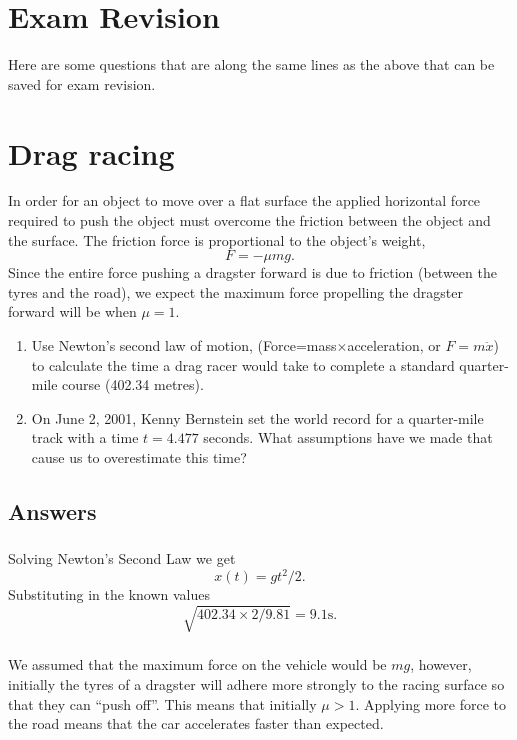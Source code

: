 \documentclass[10pt]{article}
\newcommand{\bb}{\begin{equation}}
\newcommand{\ee}{\end{equation}}
\begin{document}
\section*{Exam Revision}
Here are some questions that are along the same lines as the above that can be saved for exam revision.
\section{Drag racing}
In order for an object to move over a flat surface the applied horizontal force required to push the object must overcome the friction between the object and the surface. The friction force is proportional to the object's weight,
\bb
F=-\mu mg.
\ee
Since the entire force pushing a dragster forward is due to friction (between the tyres and the road), we expect the maximum force propelling the dragster forward will be when $\mu=1$.
\begin{enumerate}
\item Use Newton's second law of motion, (Force=mass$\times$acceleration, or $F=m\ddot{x}$) to calculate the time a drag racer would take to complete a standard quarter-mile
course (402.34 metres).
\item On June 2, 2001, Kenny Bernstein set the world record for a
quarter-mile track with a time $t = 4.477$ seconds. What assumptions have we made that cause us to overestimate this time?
\end{enumerate}
\begin{Answ}
\subsection{Answers}
\subsubsection{}
Solving Newton's Second Law we get
\bb
x(t)=gt^2/2.
\ee
Substituting in the known values
\bb
\sqrt{402.34\times 2/9.81}= 9.1 \textrm{s}.
\ee
\subsubsection{}
We assumed that the maximum force on the vehicle would be $mg$, however, initially the tyres of a dragster will adhere more strongly to the racing surface so that they can ``push off''. This means that initially $\mu>1$. Applying more force to the road means that the car accelerates faster than expected.
\end{Answ}
\end{document}

